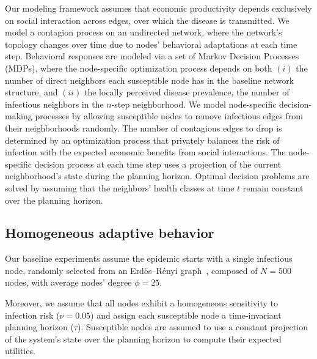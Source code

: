 \documentclass[9pt,twocolumn,twoside]{pnas-new}
\begin{document}
Our modeling framework assumes that economic productivity depends exclusively on social interaction across edges, over which the disease is transmitted. We model a contagion process on an undirected network, where the network's topology changes over time due to nodes' behavioral adaptations at each time step.
%
Behavioral responses are modeled via a set of Markov Decision Processes (MDPs), where the node-specific optimization process depends on both $(i)$ the number of direct neighbors each susceptible node has in the baseline network structure, and $(ii)$ the locally perceived disease prevalence, the number of infectious neighbors in the $n$-step neighborhood.
%
We model node-specific decision-making processes by allowing susceptible nodes to remove infectious edges from their neighborhoods randomly. The number of contagious edges to drop is determined by an optimization process that privately balances the risk of infection with the expected economic benefits from social interactions.
%
The node-specific decision process at each time step uses a projection of the current neighborhood's state during the planning horizon. Optimal decision problems are solved by assuming that the neighbors' health classes at time $t$ remain constant over the planning horizon.

\subsection*{Homogeneous adaptive behavior}
%
Our baseline experiments assume the epidemic starts with a single infectious node, randomly selected from an Erd\"{o}s–R\'{e}nyi graph~\cite{Erdos1960}, composed of $N=500$ nodes, with average nodes' degree $\phi=25$.

Moreover, we assume that all nodes exhibit a homogeneous sensitivity to infection risk ($\nu=0.05$) and assign each susceptible node a time-invariant planning horizon ($\tau$). Susceptible nodes are assumed to use a constant projection of the system's state over the planning horizon to compute their expected utilities.
\end{document}
